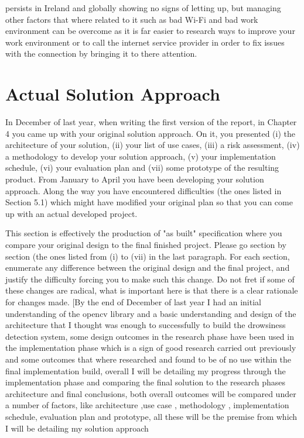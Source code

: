 \begin{enumerate}
persists in Ireland and globally showing no signs of letting up, but managing other factors that where related to it such as bad Wi-Fi and bad work environment can be overcome as it is far easier to research ways to improve your work environment or to call the internet service provider in order to fix issues with the connection by bringing it to there attention.
\end{enumerate}
	


\section{Actual Solution Approach}
In December of last year, when writing the first version of the report, in Chapter 4 you came up with your original solution approach. On it, you presented (i) the architecture of your solution, (ii) your list of use cases, (iii) a risk assessment, (iv) a methodology to develop your solution approach, (v) your implementation schedule, (vi) your evaluation plan and (vii) some prototype of the resulting product. From January to April you have been developing your solution approach. Along the way you have encountered difficulties (the ones listed in Section 5.1) which might have modified your original plan so that you can come up with an actual developed project.

This section is effectively the production of "as built" specification where you compare your original design to the final finished project. Please go section by section (the ones listed from (i) to (vii) in the last paragraph. For each section, enumerate any difference between the original design and the final project, and justify the difficulty forcing you to make such this change. Do not fret if some of these changes are radical, what is important here is that there is a clear rationale for changes made.
[By the end of December of last year I had an initial understanding of the opencv library and a basic understanding and design of the architecture that  I thought was enough to successfully to build the drowsiness detection system, some design outcomes in the research phase have been used in the implementation phase which is a sign of good research carried out previously and some outcomes that where researched and found to be of no use within the final implementation build, overall I will be detailing my progress through the implementation phase and comparing the final solution to the research phases architecture and final conclusions, both overall outcomes will be compared under a number of factors, like architecture ,use case , methodology , implementation schedule, evaluation plan and prototype,  all these will be the premise from which I will be detailing my solution approach

